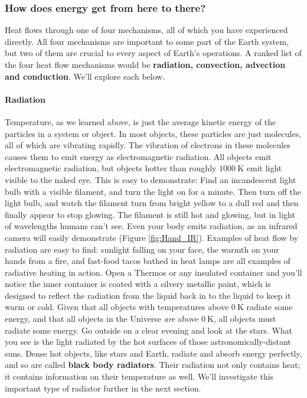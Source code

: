 \subsubsection{How does energy get from here to there?}
Heat flows through one of four mechanisms, all of which you have experienced directly. All four mechanisms are important to some part of the Earth system, but two of them are crucial to every aspect of Earth's operations. A ranked list of the four heat flow mechanisms would be \textbf{radiation, convection, advection and conduction}. We'll explore each below.

\paragraph{Radiation}
Temperature, as we learned above, is just the average kinetic energy of the particles in a system or object. In most objects, these particles are just molecules, all of which are vibrating rapidly. The vibration of electrons in these molecules causes them to emit energy as electromagnetic radiation. All objects emit electromagnetic radiation, but objects hotter than roughly $\SI{1000}{\kelvin}$ emit light visible to the naked eye. This is easy to demonstrate: Find an incandescent light bulb with a visible filament, and turn the light on for a minute. Then turn off the light bulb, and watch the filament turn from bright yellow to a dull red and then finally appear to stop glowing. The filament is still hot and glowing, but in light of wavelengths humans can't see. Even your body emits radiation, as an infrared camera will easily demonstrate (Figure \ref{fig:Hand_IR}). Examples of heat flow by radiation are easy to find: sunlight falling on your face, the warmth on your hands from a fire, and fast-food tacos bathed in heat lamps are all examples of radiative heating in action. Open a Thermos or any insulated container and you'll notice the inner container is coated with a silvery metallic paint, which is designed to reflect the radiation from the liquid back in to the liquid to keep it warm or cold.
Given that all objects with temperatures above $\SI{0}{\kelvin}$ radiate some energy, and that all objects in the Universe \textit{are} above $\SI{0}{\kelvin}$, all objects must radiate some energy. Go outside on a clear evening and look at the stars. What you see is the light radiated by the hot surfaces of those astronomically-distant suns. Dense hot objects, like stars and Earth, radiate and absorb energy perfectly, and so are called \textbf{black body radiators}. Their radiation not only contains heat; it contains information on their temperature as well. We'll investigate this important type of radiator further in the next section.

